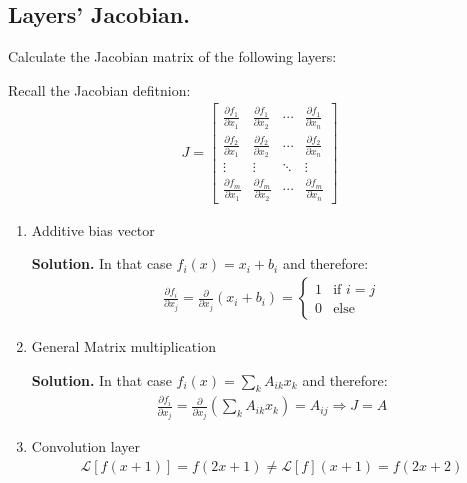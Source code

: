 \documentclass{article}
\begin{document}
\subsection{Layers’ Jacobian.} Calculate the Jacobian matrix of the following layers:

Recall the Jacobian defitnion:
  \begin{equation*}
    \begin{split}
J = \begin{bmatrix}
\frac{\partial f_1}{\partial x_1} & \frac{\partial f_1}{\partial x_2} & \cdots & \frac{\partial f_1}{\partial x_n} \\
\frac{\partial f_2}{\partial x_1} & \frac{\partial f_2}{\partial x_2} & \cdots & \frac{\partial f_2}{\partial x_n} \\
\vdots & \vdots & \ddots & \vdots \\
\frac{\partial f_m}{\partial x_1} & \frac{\partial f_m}{\partial x_2} & \cdots & \frac{\partial f_m}{\partial x_n}
\end{bmatrix}
    \end{split}
\end{equation*}

\begin{enumerate}
  \item Additive bias vector 

    \textbf{Solution.} In that case $f_i(x) = x_{i} + b_{i}$ and therefore: 
  \begin{equation*}
    \begin{split}
      \frac{\partial f_i}{\partial x_j} = \frac{\partial }{\partial x_j} \left( x_{i} + b_{i} \right) = \begin{cases} 1 & \text{if } i = j \\ 0 & \text{else}  \end{cases}
    \end{split}
\end{equation*}
  \item General Matrix multiplication


    \textbf{Solution.} In that case $f_i(x) = \sum_{k}{A_{ik}x_{k}}$ and therefore: 
  \begin{equation*}
    \begin{split}
    \frac{\partial f_i}{\partial x_j} = \frac{\partial }{\partial x_j} \left(\sum_{k}{A_{ik}x_{k}} \right) = A_{ij} \Rightarrow J = A
    \end{split}
\end{equation*}
  \item Convolution layer
  \begin{equation*}
    \begin{split}
    \mathcal{L}[f(x+1)] = f(2x+1) \neq \mathcal{L}[f](x+1)= f(2x + 2)
    \end{split}
\end{equation*}
\end{enumerate}
\end{document}
